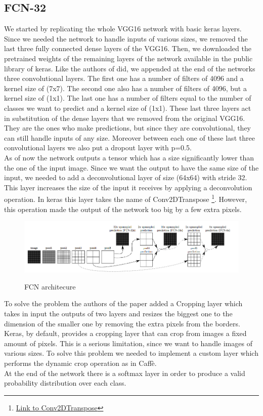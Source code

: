 \documentclass[10pt,twocolumn,letterpaper]{article}
\begin{document}
\subsection{FCN-32}
We started by replicating the whole VGG16 network with basic keras layers. Since we needed the network to handle inputs of various sizes, we removed the last three fully connected dense layers of the VGG16. Then, we downloaded the pretrained weights of the remaining layers of the network available in the public library of keras.
Like the authors of \cite{projectPaper} did, we appended at the end of the networks three convolutional layers. The first one has a number of filters of 4096 and a kernel size of (7x7). The second one also has a number of filters of 4096, but a kernel size of (1x1). The last one has a number of filters equal to the number of classes we want to predict and a kernel size of (1x1).
These last three layers act in substitution of the dense layers that we removed from the original VGG16. They are the ones who make predictions, but since they are convolutional, they can still handle inputs of any size.
Moreover between each one of these last three convolutional layers we also put a dropout layer with p=0.5.\\
As of now the network outputs a tensor which has a size significantly lower than the one of the input image. Since we want the output to have the same size of the input, we needed to add a deconvolutional layer of size (64x64) with stride 32. This layer increases the size of the input it receives by applying a deconvolution operation. In keras this layer takes the name of Conv2DTranspose \footnote{\href{https://www.tensorflow.org/api_docs/python/tf/keras/layers/Conv2DTranspose}{Link to Conv2DTranspose}}. However, this operation made the output of the network too big by a few extra pixels.\\
\begin{figure}
	\includegraphics[width=\textwidth]{image/fcn}
	\label{fcn}
	\centering
	\caption{FCN architecure}
\end{figure}
To solve the problem the authors of the paper added a Cropping layer which takes in input the outputs of two layers and resizes the biggest one to the dimension of the smaller one by removing the extra pixels from the borders. Keras, by default, provides a cropping layer that can crop from images a fixed amount of pixels. This is a serious limitation, since we want to handle images of various sizes. To solve this problem we needed to implement a custom layer which performs the dynamic crop operation as in Caffè. \\ At the end of the network there is a softmax layer in order to produce a valid probability distribution over each class.
\end{document}

